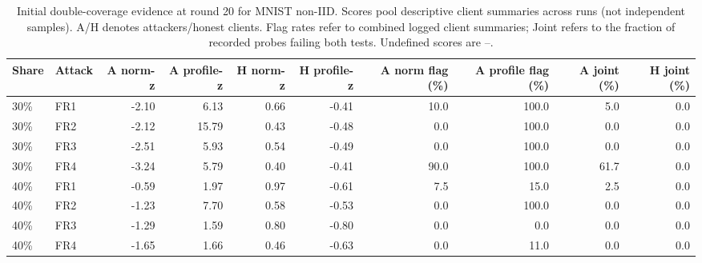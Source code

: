 \documentclass[conference]{IEEEtran}
\begin{document}
\begin{table}[t]\centering\scriptsize
\setlength{\tabcolsep}{3.5pt}
\caption{Initial double-coverage evidence at round 20 for MNIST non-IID. Scores pool descriptive client summaries across runs (not independent samples). A/H denotes attackers/honest clients. Flag rates refer to combined logged client summaries; Joint refers to the fraction of recorded probes failing both tests. Undefined scores are --.}
\begin{tabular}{llrrrrrrrr}\toprule
Share & Attack & A norm-z & A profile-z & H norm-z & H profile-z & A norm flag (\%) & A profile flag (\%) & A joint (\%) & H joint (\%) \\\midrule
30\% & FR1 & -2.10 & 6.13 & 0.66 & -0.41 & 10.0 & 100.0 & 5.0 & 0.0 \\
30\% & FR2 & -2.12 & 15.79 & 0.43 & -0.48 & 0.0 & 100.0 & 0.0 & 0.0 \\
30\% & FR3 & -2.51 & 5.93 & 0.54 & -0.49 & 0.0 & 100.0 & 0.0 & 0.0 \\
30\% & FR4 & -3.24 & 5.79 & 0.40 & -0.41 & 90.0 & 100.0 & 61.7 & 0.0 \\
40\% & FR1 & -0.59 & 1.97 & 0.97 & -0.61 & 7.5 & 15.0 & 2.5 & 0.0 \\
40\% & FR2 & -1.23 & 7.70 & 0.58 & -0.53 & 0.0 & 100.0 & 0.0 & 0.0 \\
40\% & FR3 & -1.29 & 1.59 & 0.80 & -0.80 & 0.0 & 0.0 & 0.0 & 0.0 \\
40\% & FR4 & -1.65 & 1.66 & 0.46 & -0.63 & 0.0 & 11.0 & 0.0 & 0.0 \\
\bottomrule\end{tabular}\end{table}
\end{document}
